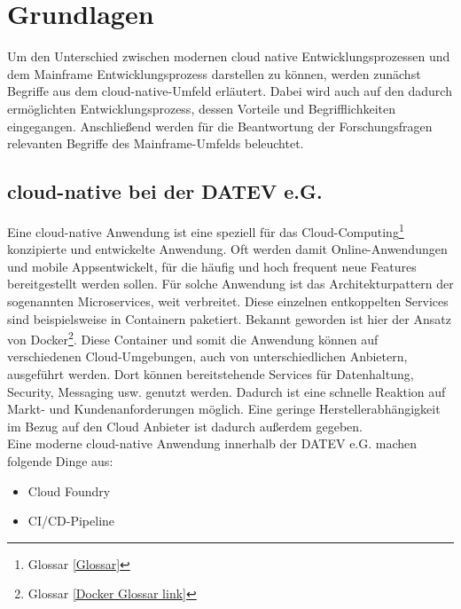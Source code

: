 \chapter{Grundlagen}\label{ch:grundlagen}
Um den Unterschied zwischen modernen cloud native Entwicklungsprozessen und dem Mainframe Entwicklungsprozess darstellen zu können, werden zunächst Begriffe aus dem cloud-native-Umfeld erläutert.
Dabei wird auch auf den dadurch ermöglichten Entwicklungsprozess, dessen Vorteile und Begrifflichkeiten eingegangen.
Anschließend werden für die Beantwortung der Forschungsfragen relevanten Begriffe des Mainframe-Umfelds beleuchtet.

\section{cloud-native bei der DATEV e.G.}\label{sec:cloudnative}
Eine cloud-native Anwendung ist eine speziell für das Cloud-Computing\footnote{Glossar \ref{Glossar}} konzipierte und entwickelte Anwendung.
Oft werden damit Online-Anwendungen und mobile \glqq Apps\grqq entwickelt, für die häufig und hoch frequent neue Features bereitgestellt werden sollen. 
Für solche Anwendung ist das Architekturpattern der sogenannten \glqq Microservices\grqq, weit verbreitet.
Diese einzelnen entkoppelten Services sind beispielsweise in Containern paketiert. 
Bekannt geworden ist hier der Ansatz von Docker\footnote{Glossar \ref{Docker Glossar link}}.
Diese Container und somit die Anwendung können auf verschiedenen Cloud-Umgebungen, auch von unterschiedlichen Anbietern,  ausgeführt werden.
Dort können bereitstehende Services für Datenhaltung, Security, Messaging usw. genutzt werden. 
Dadurch ist eine schnelle Reaktion auf Markt- und Kundenanforderungen möglich.
Eine geringe Herstellerabhängigkeit im Bezug auf den Cloud Anbieter ist dadurch außerdem gegeben.
\cite{cloudnative.23.2.2020}\\
Eine moderne cloud-native Anwendung innerhalb der DATEV e.G. machen folgende Dinge aus:
\begin{itemize}
\item \glqq Cloud Foundry\grqq
\item CI/CD-Pipeline
\end{itemize}

